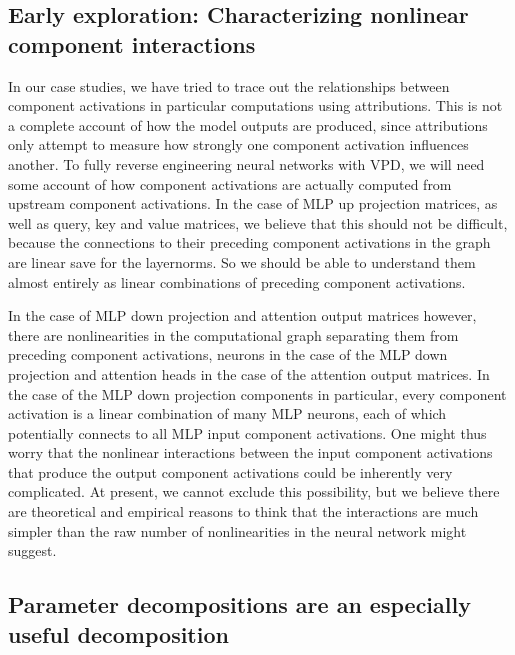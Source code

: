 \documentclass{article}
\begin{document}
\subsection{Early exploration: Characterizing nonlinear component interactions}
In our case studies, we have tried to trace out the relationships between component activations in particular computations using attributions. This is not a complete account of how the model outputs are produced, since attributions only attempt to measure how strongly one component activation influences another. To fully reverse engineering neural networks with VPD, we will need some account of how component activations are actually computed from upstream component activations. In the case of MLP up projection matrices, as well as query, key and value matrices, we believe that this should not be difficult, because the connections to their preceding component activations in the graph are linear save for the layernorms. So we should be able to understand them almost entirely as linear combinations of preceding component activations.

In the case of MLP down projection and attention output matrices however, there are nonlinearities in the computational graph separating them from preceding component activations, neurons in the case of the MLP down projection and attention heads in the case of the attention output matrices. In the case of the MLP down projection components in particular, every component activation is a linear combination of many MLP neurons, each of which potentially connects to all MLP input component activations. One might thus worry that the nonlinear interactions between the input component activations that produce the output component activations could be inherently very complicated. At present, we cannot exclude this possibility, but we believe there are theoretical and empirical reasons to think that the interactions are much simpler than the raw number of nonlinearities in the neural network might suggest.
\subsubsection{}

\subsection{Parameter decompositions are an especially useful decomposition}
\end{document}
